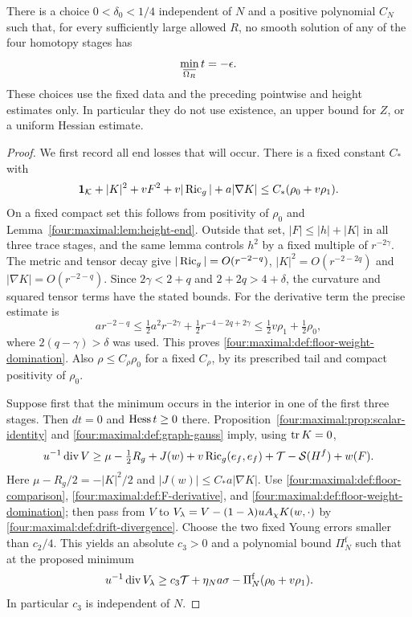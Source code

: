\begin{proposition}\label{four:maximal:prop:floor}
There is a choice $0<\delta_0<1/4$ independent of $N$ and a positive
polynomial $C_N$ such that, for every sufficiently large allowed $R$,
no smooth solution of any of the four homotopy stages has
\[
 \min_{\overline{\Omega_R}}t=-\epsilon.
\]
These choices use the fixed data and the preceding pointwise and height
estimates only.  In particular they do not use existence, an upper bound
for $Z$, or a uniform Hessian estimate.
\end{proposition}

\begin{proof}
We first record all end losses that will occur.  There is a fixed
constant $C_*$ with
\begin{equation}\label{four:maximal:def:floor-weight-domination}
 \mathbf1_{\mathcal K}+|K|^2+vF^2+v|\operatorname{Ric}_g|+a|\nabla K|
 \le C_*(\rho_0+v\rho_1).
\end{equation}
On a fixed compact set this follows from positivity of $\rho_0$ and
Lemma~\ref{four:maximal:lem:height-end}.  Outside that set,
$|F|\le |h|+|K|$ in all three trace stages, and the same lemma controls
$h^2$ by a fixed multiple of $r^{-2\gamma}$.
The metric and tensor decay give
$|\operatorname{Ric}_g|=O(r^{-2-q})$, $|K|^2=O(r^{-2-2q})$ and
$|\nabla K|=O(r^{-2-q})$.  Since $2\gamma<2+q$ and $2+2q>4+\delta$,
the curvature and squared tensor terms have the stated bounds.
For the derivative term the precise estimate is
\[
 ar^{-2-q}
 \le\tfrac12a^2r^{-2\gamma}
       +\tfrac12r^{-4-2q+2\gamma}
 \le\tfrac12v\rho_1+\tfrac12\rho_0,
\]
where $2(q-\gamma)>\delta$ was used.  This proves
\eqref{four:maximal:def:floor-weight-domination}.  Also $\rho\le C_\rho\rho_0$ for a
fixed $C_\rho$, by its prescribed tail and compact positivity of $\rho_0$.

Suppose first that the minimum occurs in the interior in one of the
first three stages.  Then $dt=0$ and $\operatorname{Hess} t\ge0$ there.
Proposition~\ref{four:maximal:prop:scalar-identity} and
\eqref{four:maximal:def:graph-gauss} imply, using $\operatorname{tr} K=0$,
\[
 u^{-1}\operatorname{div} V
 \ge\mu-\tfrac12R_g+J(w)+v\operatorname{Ric}_g(e_f,e_f)
       +\mathcal T-\mathcal S(H^f)+w(F).
\]
Here $\mu-R_g/2=-|K|^2/2$ and
$|J(w)|\le C_*a|\nabla K|$.
Use \eqref{four:maximal:def:floor-comparison}, \eqref{four:maximal:def:F-derivative}, and
\eqref{four:maximal:def:floor-weight-domination}; then pass from $V$ to
$V_\lambda=V-(1-\lambda)uA_\chi K(w,\cdot)$ by
\eqref{four:maximal:def:drift-divergence}.  Choose the two fixed Young errors smaller
than $c_2/4$.  This yields an absolute $c_3>0$ and a polynomial bound
$\Pi_N^{\mathrm f}$ such that at the proposed minimum
\begin{equation}\label{four:maximal:def:floor-divergence}
 u^{-1}\operatorname{div} V_\lambda
 \ge c_3\mathcal T+\eta_N a\sigma
       -\Pi_N^{\mathrm f}(\rho_0+v\rho_1).
\end{equation}
In particular $c_3$ is independent of $N$.


\end{proof}
